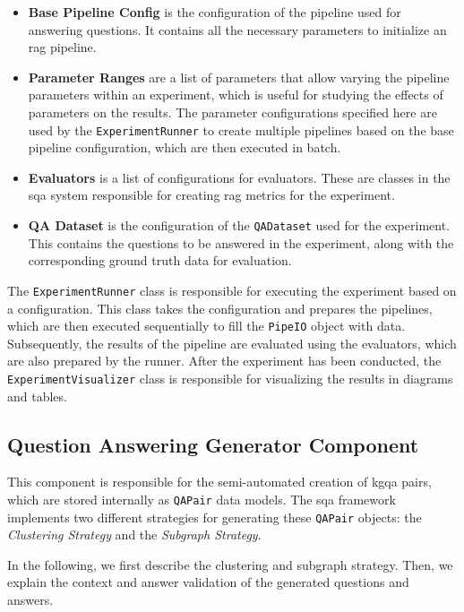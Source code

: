 \begin{itemize}
    \item \textbf{Base Pipeline Config} is the configuration of the pipeline used for answering questions. It contains all the necessary parameters to initialize an \gls{rag} pipeline.
    \item \textbf{Parameter Ranges} are a list of parameters that allow varying the pipeline parameters within an experiment, which is useful for studying the effects of parameters on the results. The parameter configurations specified here are used by the \texttt{ExperimentRunner} to create multiple pipelines based on the base pipeline configuration, which are then executed in batch.
    \item \textbf{Evaluators} is a list of configurations for evaluators. These are classes in the \gls{sqa} system responsible for creating \gls{rag} metrics for the experiment.
    \item \textbf{QA Dataset} is the configuration of the \texttt{QADataset} used for the experiment. This contains the questions to be answered in the experiment, along with the corresponding ground truth data for evaluation.
\end{itemize}

The \texttt{ExperimentRunner} class is responsible for executing the experiment based on a configuration. This class takes the configuration and prepares the pipelines, which are then executed sequentially to fill the \texttt{PipeIO} object with data. Subsequently, the results of the pipeline are evaluated using the evaluators, which are also prepared by the runner. After the experiment has been conducted, the \texttt{ExperimentVisualizer} class is responsible for visualizing the results in diagrams and tables.

\subsection{Question Answering Generator Component}
\label{sec:qa_generator}
This component is responsible for the semi-automated creation of \gls{kgqa} pairs, which are stored internally as \texttt{QAPair} data models. The \gls{sqa} framework implements two different strategies for generating these \texttt{QAPair} objects: the \emph{Clustering Strategy} and the \emph{Subgraph Strategy}.

In the following, we first describe the clustering and subgraph strategy. Then, we explain the context and answer validation of the generated questions and answers.

